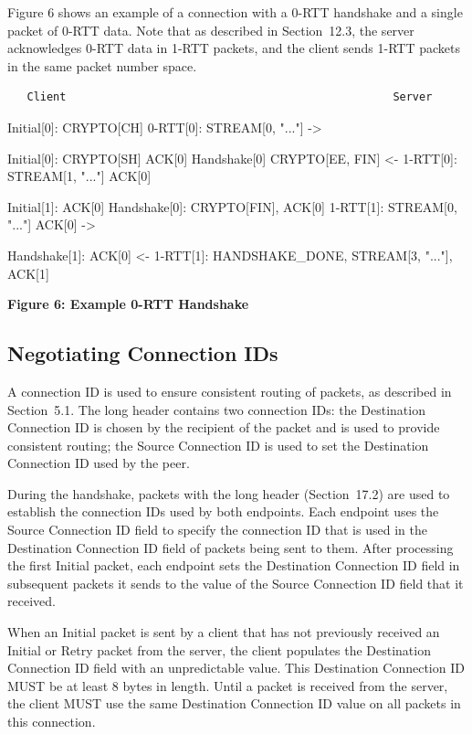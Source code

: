 \documentclass{article}
\begin{document}
Figure 6 shows an example of a connection with a 0-RTT handshake and a single packet of 0-RTT data.  Note that as described in Section~12.3, the server acknowledges 0-RTT data in 1-RTT packets, and the client sends 1-RTT packets in the same packet number space.

\begin{verbatim}
   Client                                                  Server
\end{verbatim}

Initial[0]: CRYPTO[CH] 0-RTT[0]: STREAM[0, "..."] ->

Initial[0]: CRYPTO[SH] ACK[0] Handshake[0] CRYPTO[EE, FIN] <- 1-RTT[0]: STREAM[1, "..."] ACK[0]

Initial[1]: ACK[0] Handshake[0]: CRYPTO[FIN], ACK[0] 1-RTT[1]: STREAM[0, "..."] ACK[0] ->

Handshake[1]: ACK[0] <- 1-RTT[1]: HANDSHAKE\_DONE, STREAM[3, "..."], ACK[1]

\begin{center}
\textbf{Figure 6: Example 0-RTT Handshake}
\end{center}

\subsection{Negotiating Connection IDs}

A connection ID is used to ensure consistent routing of packets, as described in Section~5.1.  The long header contains two connection IDs: the Destination Connection ID is chosen by the recipient of the packet and is used to provide consistent routing; the Source Connection ID is used to set the Destination Connection ID used by the peer.

During the handshake, packets with the long header (Section~17.2) are used to establish the connection IDs used by both endpoints.  Each endpoint uses the Source Connection ID field to specify the connection ID that is used in the Destination Connection ID field of packets being sent to them.  After processing the first Initial packet, each endpoint sets the Destination Connection ID field in subsequent packets it sends to the value of the Source Connection ID field that it received.

When an Initial packet is sent by a client that has not previously received an Initial or Retry packet from the server, the client populates the Destination Connection ID field with an unpredictable value.  This Destination Connection ID MUST be at least 8 bytes in length.  Until a packet is received from the server, the client MUST use the same Destination Connection ID value on all packets in this connection.
\end{document}
